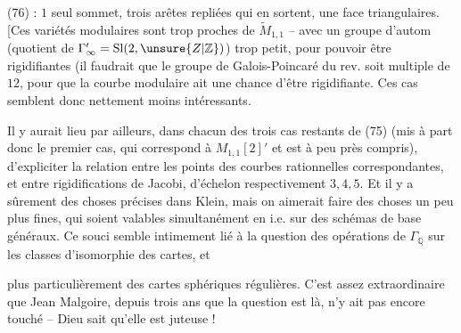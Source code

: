 (76) 
: $1$ seul sommet,
trois arêtes repliées qui en sortent, une face
triangulaires. [Ces variétés modulaires sont
trop proches de $\widetilde M_{1,1}$ -- avec un groupe
d'autom (quotient de $\Gamma'_\infty=\mathrm{Sl}(2,\unsure{Z|\mathbb Z})$) trop petit,
pour pouvoir être rigidifiantes (il faudrait
que le groupe de Galois-Poincaré du rev.
soit multiple de $12$, pour que  la courbe modulaire ait une chance d'être rigidifiante. Ces
cas semblent donc nettement moins intéressants.

Il y aurait lieu par ailleurs, dans chacun des
trois cas restants de (75) (mis à part donc le
premier cas, qui correspond à $M_{1,1}[2]'$ et est
à peu près compris), d'expliciter la relation
entre les points des courbes rationnelles
correspondantes, et entre  rigidifications de
Jacobi, d'échelon respectivement $3,4,5$. Et il y
a sûrement des choses précises dans Klein,
mais on aimerait faire des choses un peu
plus fines, qui soient valables simultanément
en  i.e. sur des schémas
de base généraux. Ce souci semble intimement lié à la question des opérations de
$\Gamma_{\mathbb Q}$ sur les classes d'isomorphie des cartes, et

plus particulièrement des cartes sphériques
régulières. C'est assez extraordinaire que
Jean Malgoire, depuis trois ans que la
question est là, n'y ait pas encore touché
-- Dieu sait qu'elle est juteuse !

